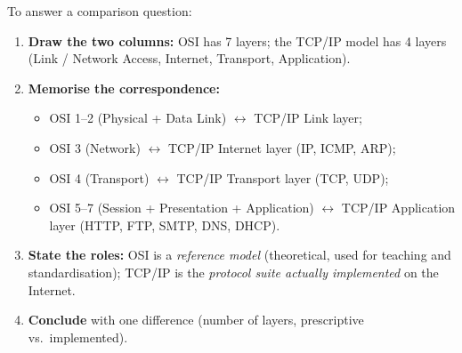 \documentclass[11pt]{article}
\begin{document}
\begin{methode}
To answer a comparison question:
\begin{enumerate}
\item \textbf{Draw the two columns:} OSI has 7 layers; the TCP/IP model has 4 layers (Link / Network Access, Internet, Transport, Application).
\item \textbf{Memorise the correspondence:}
\begin{itemize}
\item OSI 1--2 (Physical + Data Link) $\leftrightarrow$ TCP/IP Link layer;
\item OSI 3 (Network) $\leftrightarrow$ TCP/IP Internet layer (IP, ICMP, ARP);
\item OSI 4 (Transport) $\leftrightarrow$ TCP/IP Transport layer (TCP, UDP);
\item OSI 5--7 (Session + Presentation + Application) $\leftrightarrow$ TCP/IP Application layer (HTTP, FTP, SMTP, DNS, DHCP).
\end{itemize}
\item \textbf{State the roles:} OSI is a \emph{reference model} (theoretical, used for teaching and standardisation); TCP/IP is the \emph{protocol suite actually implemented} on the Internet.
\item \textbf{Conclude} with one difference (number of layers, prescriptive vs.\ implemented).
\end{enumerate}
\end{methode}
\end{document}
